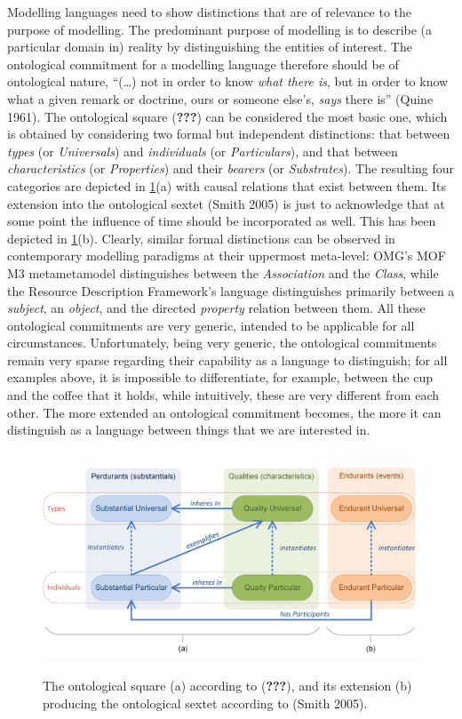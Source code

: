 \documentclass[a4paper,11pt,oneside,oldfontcommands]{memoir}
\newcounter{para}
\theoremstyle{definition}
\theoremstyle{break}		%
\numberwithin{equation}{chapter}
\numberwithin{figure}{chapter}
\begin{document}
Modelling languages need to show distinctions that are of relevance to
the purpose of modelling. The predominant purpose of modelling is to
describe (a particular domain in) reality by distinguishing the entities
of interest. The ontological commitment for a modelling language
therefore should be of ontological nature, ``(\ldots{}) not in order to
know \emph{what there is}, but in order to know what a given remark or
doctrine, ours or someone else's, \emph{says} there is'' (Quine 1961).
The ontological square ({\textbf{???}}) can be considered the most basic
one, which is obtained by considering two formal but independent
distinctions: that between \emph{types} (or \emph{Universals}) and
\emph{individuals} (or \emph{Particulars}), and that between
\emph{characteristics} (or \emph{Properties}) and their \emph{bearers}
(or \emph{Substrates}). The resulting four categories are depicted in
\cref{fig:onto-square-and-sextet}(a) with causal relations that exist
between them. Its extension into the ontological sextet (Smith 2005) is
just to acknowledge that at some point the influence of time should be
incorporated as well. This has been depicted in
\cref{fig:onto-square-and-sextet}(b). Clearly, similar formal
distinctions can be observed in contemporary modelling paradigms at
their uppermost meta-level: OMG's MOF M3 metametamodel distinguishes
between the \emph{Association} and the \emph{Class}, while the Resource
Description Framework's language distinguishes primarily between a
\emph{subject}, an \emph{object}, and the directed \emph{property}
relation between them. All these ontological commitments are very
generic, intended to be applicable for all circumstances. Unfortunately,
being very generic, the ontological commitments remain very sparse
regarding their capability as a language to distinguish; for all
examples above, it is impossible to differentiate, for example, between
the cup and the coffee that it holds, while intuitively, these are very
different from each other. The more extended an ontological commitment
becomes, the more it can distinguish as a language between things that
we are interested in.

\begin{figure}
\hypertarget{fig:onto-square-and-sextet}{%
\centering
\includegraphics[width=5.20833in,height=2.60417in]{src/images/OntoSquareAndSextet.png}
\caption{The ontological square (a) according to ({\textbf{???}}), and
its extension (b) producing the ontological sextet according to (Smith
2005).}\label{fig:onto-square-and-sextet}
}
\end{figure}
\end{document}
